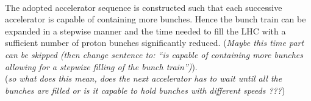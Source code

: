 \\
The adopted accelerator sequence is constructed such that each successive accelerator is capable of containing more bunches. Hence the bunch train can be expanded in a stepwise manner and the time needed to fill the LHC with a sufficient number of proton bunches significantly reduced. (\textit{Maybe this time part can be skipped (then change sentence to: ``is capable of containing more bunches allowing for a stepwize filling of the bunch train'')}).\\
(\textit{so what does this mean, does the next accelerator has to wait until all the bunches are filled or is it capable to hold bunches with different speeds ???})
